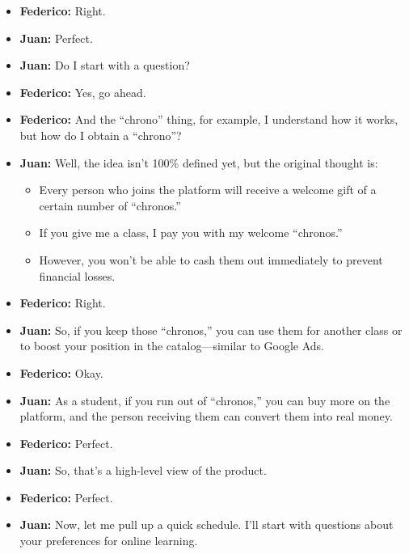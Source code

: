 \begin{enumerate}
\begin{itemize}
        \item \textbf{Federico:} Right.

        \item \textbf{Juan:} Perfect.

        \item \textbf{Juan:} Do I start with a question?
        \item \textbf{Federico:} Yes, go ahead.

        \item \textbf{Federico:} And the ``chrono'' thing, for example, I understand how it works, but how do I obtain a ``chrono''?

        \item \textbf{Juan:} Well, the idea isn’t 100\% defined yet, but the original thought is:
        \begin{itemize}
            \item Every person who joins the platform will receive a welcome gift of a certain number of ``chronos.''
            \item If you give me a class, I pay you with my welcome ``chronos.''
            \item However, you won’t be able to cash them out immediately to prevent financial losses.
        \end{itemize}

        \item \textbf{Federico:} Right.

        \item \textbf{Juan:} So, if you keep those ``chronos,'' you can use them for another class or to boost your position in the catalog—similar to Google Ads.

        \item \textbf{Federico:} Okay.

        \item \textbf{Juan:} As a student, if you run out of ``chronos,'' you can buy more on the platform, and the person receiving them can convert them into real money.

        \item \textbf{Federico:} Perfect.

        \item \textbf{Juan:} So, that's a high-level view of the product.

        \item \textbf{Federico:} Perfect.

        \item \textbf{Juan:} Now, let me pull up a quick schedule.
        I'll start with questions about your preferences for online learning.


\end{itemize}
\end{enumerate}

